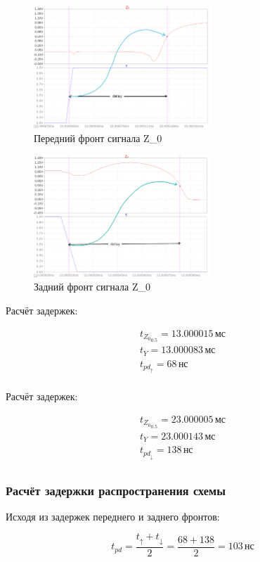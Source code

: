 \setlength{\columnsep}{2.6cm}

\begin{multicols}{2}

	\begin{figure}[H]
		\centering
		\includegraphics[width=0.6\textwidth]{../data/boe_front_delay.png}
		\captionsetup{width=1\textwidth}
		\centering
		\caption{Передний фронт сигнала Z_0}
	\end{figure}

	\begin{figure}[H]
		\centering
		\includegraphics[width=0.6\textwidth]{../data/boe_back_delay.png}
		\captionsetup{width=1\textwidth}
		\centering
		\caption{Задний фронт сигнала Z_0}
	\end{figure}

	\columnbreak

	\centering
	\vspace*{0.9cm}
	Расчёт задержек:

	\vspace*{-0.3cm}
	\[
		\begin{gathered}
			t_{{Z_0}_{0.5}} = 13.000015 \, \text{мс} \\
			t_{Y} = 13.000083 \, \text{мс} \\
			t_{pd_\uparrow} = 68 \, \text{нс} \\
		\end{gathered}
	\]

	\vspace*{5cm}
	Расчёт задержек:

	\vspace*{-0.3cm}
	\[
		\begin{gathered}
			t_{{Z_0}_{0.5}} = 23.000005 \, \text{мс} \\
			t_{Y} = 23.000143 \, \text{мс} \\
			t_{pd_\downarrow} = 138 \, \text{нс} \\
		\end{gathered}
	\]
\end{multicols}

\subsubsection{Расчёт задержки распространения схемы}
Исходя из задержек переднего и заднего фронтов:

\[
	t_{pd} = \frac{t_\uparrow + t_\downarrow}{2} = \frac{68+138}{2} = 103 \, \text{нс}
\]

